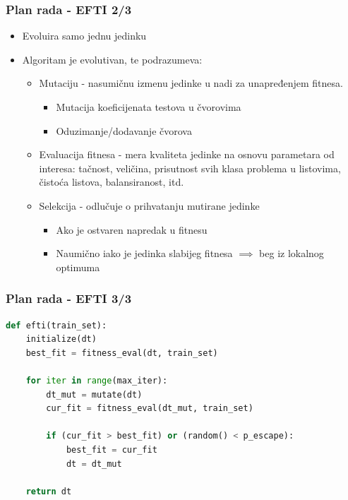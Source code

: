 \documentclass{beamer}
\begin{document}
\begin{frame}
\frametitle{Plan rada - EFTI 2/3}
\begin{itemize}
\setlength{\itemsep}{\fill}
\item Evoluira samo jednu jedinku
\item Algoritam je evolutivan, te podrazumeva:
\begin{itemize}
\setlength{\itemsep}{\fill}
\item Mutaciju - nasumičnu izmenu jedinke u nadi za unapređenjem fitnesa. 
\begin{itemize}
\item Mutacija koeficijenata testova u čvorovima
\item Oduzimanje/dodavanje čvorova 
\end{itemize}
\item Evaluacija fitnesa - mera kvaliteta jedinke na osnovu parametara od interesa: tačnost, veličina, prisutnost svih klasa problema u listovima, čistoća listova, balansiranost, itd.
\item Selekcija - odlučuje o prihvatanju mutirane jedinke
\begin{itemize}
\item Ako je ostvaren napredak u fitnesu
\item Naumično iako je jedinka slabijeg fitnesa $\implies$ beg iz lokalnog optimuma
\end{itemize}
\end{itemize}
\end{itemize}
\end{frame}


\begin{frame}[fragile]
\frametitle{Plan rada - EFTI 3/3}
\small\begin{lstlisting}[language=Python]
def efti(train_set):
    initialize(dt)
    best_fit = fitness_eval(dt, train_set)

    for iter in range(max_iter):
        dt_mut = mutate(dt)
        cur_fit = fitness_eval(dt_mut, train_set)

        if (cur_fit > best_fit) or (random() < p_escape):
            best_fit = cur_fit
            dt = dt_mut

    return dt
\end{lstlisting}
\end{frame}

\end{document}
